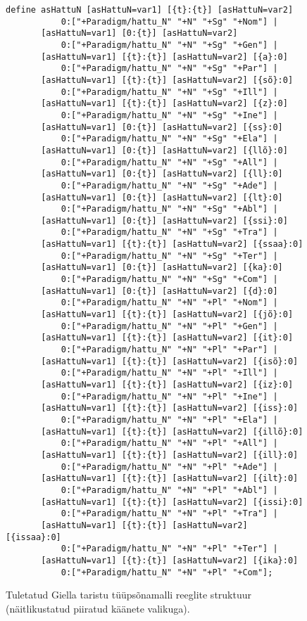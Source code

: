 \documentclass[12pt,a4paper]{article}
\begin{document}
\begin{figure}[H]
\begin{verbatim}
define asHattuN [asHattuN=var1] [{t}:{t}] [asHattuN=var2]
           0:["+Paradigm/hattu_N" "+N" "+Sg" "+Nom"] |
       [asHattuN=var1] [0:{t}] [asHattuN=var2]
           0:["+Paradigm/hattu_N" "+N" "+Sg" "+Gen"] |
       [asHattuN=var1] [{t}:{t}] [asHattuN=var2] [{a}:0]
           0:["+Paradigm/hattu_N" "+N" "+Sg" "+Par"] |
       [asHattuN=var1] [{t}:{t}] [asHattuN=var2] [{sõ}:0]
           0:["+Paradigm/hattu_N" "+N" "+Sg" "+Ill"] |
       [asHattuN=var1] [{t}:{t}] [asHattuN=var2] [{z}:0]
           0:["+Paradigm/hattu_N" "+N" "+Sg" "+Ine"] |
       [asHattuN=var1] [0:{t}] [asHattuN=var2] [{ss}:0]
           0:["+Paradigm/hattu_N" "+N" "+Sg" "+Ela"] |
       [asHattuN=var1] [0:{t}] [asHattuN=var2] [{llõ}:0]
           0:["+Paradigm/hattu_N" "+N" "+Sg" "+All"] |
       [asHattuN=var1] [0:{t}] [asHattuN=var2] [{ll}:0]
           0:["+Paradigm/hattu_N" "+N" "+Sg" "+Ade"] |
       [asHattuN=var1] [0:{t}] [asHattuN=var2] [{lt}:0]
           0:["+Paradigm/hattu_N" "+N" "+Sg" "+Abl"] |
       [asHattuN=var1] [0:{t}] [asHattuN=var2] [{ssi}:0]
           0:["+Paradigm/hattu_N" "+N" "+Sg" "+Tra"] |
       [asHattuN=var1] [{t}:{t}] [asHattuN=var2] [{ssaa}:0]
           0:["+Paradigm/hattu_N" "+N" "+Sg" "+Ter"] |
       [asHattuN=var1] [0:{t}] [asHattuN=var2] [{ka}:0]
           0:["+Paradigm/hattu_N" "+N" "+Sg" "+Com"] |
       [asHattuN=var1] [0:{t}] [asHattuN=var2] [{d}:0]
           0:["+Paradigm/hattu_N" "+N" "+Pl" "+Nom"] |
       [asHattuN=var1] [{t}:{t}] [asHattuN=var2] [{jõ}:0]
           0:["+Paradigm/hattu_N" "+N" "+Pl" "+Gen"] |
       [asHattuN=var1] [{t}:{t}] [asHattuN=var2] [{it}:0]
           0:["+Paradigm/hattu_N" "+N" "+Pl" "+Par"] |
       [asHattuN=var1] [{t}:{t}] [asHattuN=var2] [{isõ}:0]
           0:["+Paradigm/hattu_N" "+N" "+Pl" "+Ill"] |
       [asHattuN=var1] [{t}:{t}] [asHattuN=var2] [{iz}:0]
           0:["+Paradigm/hattu_N" "+N" "+Pl" "+Ine"] |
       [asHattuN=var1] [{t}:{t}] [asHattuN=var2] [{iss}:0]
           0:["+Paradigm/hattu_N" "+N" "+Pl" "+Ela"] |
       [asHattuN=var1] [{t}:{t}] [asHattuN=var2] [{illõ}:0]
           0:["+Paradigm/hattu_N" "+N" "+Pl" "+All"] |
       [asHattuN=var1] [{t}:{t}] [asHattuN=var2] [{ill}:0]
           0:["+Paradigm/hattu_N" "+N" "+Pl" "+Ade"] |
       [asHattuN=var1] [{t}:{t}] [asHattuN=var2] [{ilt}:0]
           0:["+Paradigm/hattu_N" "+N" "+Pl" "+Abl"] |
       [asHattuN=var1] [{t}:{t}] [asHattuN=var2] [{issi}:0]
           0:["+Paradigm/hattu_N" "+N" "+Pl" "+Tra"] |
       [asHattuN=var1] [{t}:{t}] [asHattuN=var2] [{issaa}:0]
           0:["+Paradigm/hattu_N" "+N" "+Pl" "+Ter"] |
       [asHattuN=var1] [{t}:{t}] [asHattuN=var2] [{ika}:0]
           0:["+Paradigm/hattu_N" "+N" "+Pl" "+Com"];
\end{verbatim}
\caption{Tuletatud Giella taristu tüüpsõnamalli reeglite struktuur (näitlikustatud piiratud käänete valikuga).
  \label{code:giella-lexicon}}
\end{figure}
\end{document}
